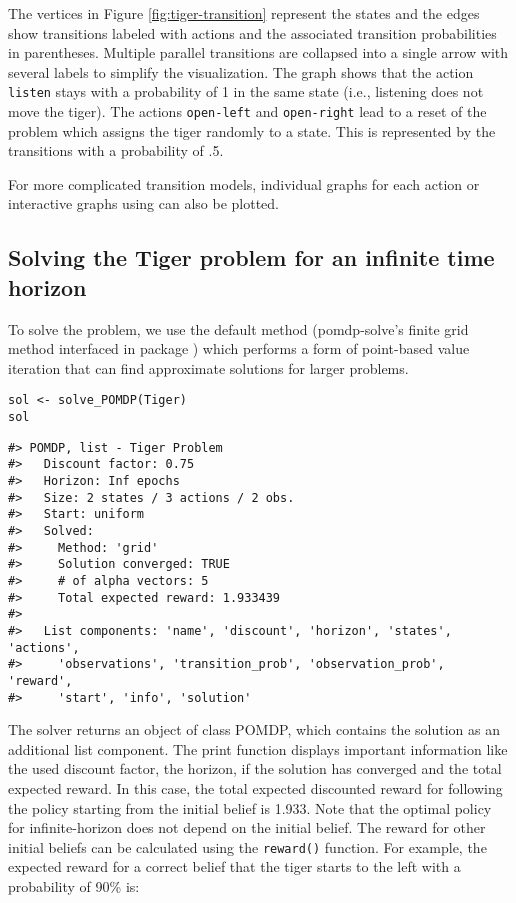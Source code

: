 The vertices in Figure \ref{fig:tiger-transition} represent the states and
the edges show transitions labeled with actions and the associated transition probabilities in parentheses. Multiple parallel transitions are
collapsed into a single arrow with several labels to simplify the visualization.
The graph shows that the action \texttt{listen} stays with a probability of 1
in the same state (i.e., listening does not move the tiger). The actions \texttt{open-left} and \texttt{open-right} lead to
a reset of the problem which assigns the tiger randomly to a state. This is represented by the transitions with a
probability of .5.

For more complicated transition models, individual graphs for each action or interactive
graphs using  can also be plotted.

\subsection{Solving the Tiger problem for an infinite time horizon}\label{solving-the-tiger-problem-for-an-infinite-time-horizon}

To solve the problem, we use the default method (pomdp-solve's finite grid method interfaced
in package )
which performs a form of point-based value iteration that can find
approximate solutions for larger problems.

\begin{verbatim}
sol <- solve_POMDP(Tiger)
sol
\end{verbatim}

\begin{verbatim}
#> POMDP, list - Tiger Problem
#>   Discount factor: 0.75
#>   Horizon: Inf epochs
#>   Size: 2 states / 3 actions / 2 obs.
#>   Start: uniform
#>   Solved:
#>     Method: 'grid'
#>     Solution converged: TRUE
#>     # of alpha vectors: 5
#>     Total expected reward: 1.933439
#> 
#>   List components: 'name', 'discount', 'horizon', 'states', 'actions',
#>     'observations', 'transition_prob', 'observation_prob', 'reward',
#>     'start', 'info', 'solution'
\end{verbatim}

The solver returns an object of class POMDP, which contains the solution as an
additional list component. The print function displays important information like the
used discount factor, the horizon, if the solution has converged and the total expected reward. In this case, the total expected discounted reward for following the policy starting from the initial belief is 1.933.
Note that
the optimal policy for infinite-horizon does not depend on the
initial belief.
The reward for other initial beliefs can be calculated using the
\texttt{reward()} function. For example, the expected reward for a correct
belief that the tiger starts to the left with a probability of 90\% is:

